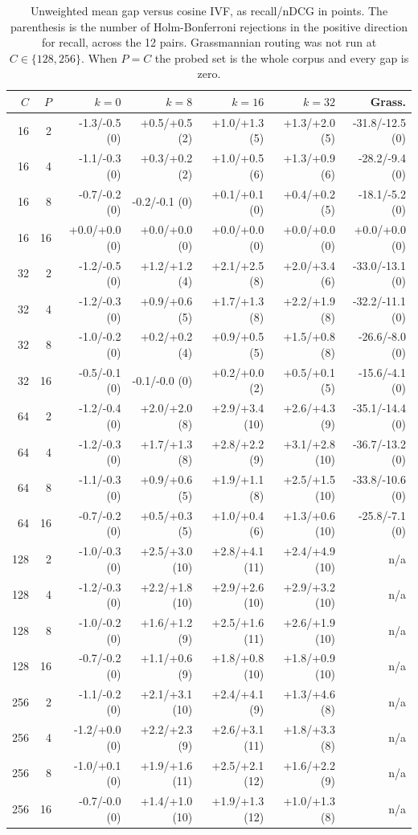 \begin{table}[t]
\centering
\caption{Unweighted mean gap versus cosine IVF, as recall/nDCG in points. The parenthesis is the number of Holm-Bonferroni rejections in the positive direction for recall, across the 12 pairs. Grassmannian routing was not run at $C \in \{128, 256\}$. When $P{=}C$ the probed set is the whole corpus and every gap is zero.}
\label{tab:kcurve}
\scriptsize
\setlength{\tabcolsep}{3pt}
\begin{tabular}{rrrrrrr}
\toprule
$C$ & $P$ & $k{=}0$ & $k{=}8$ & $k{=}16$ & $k{=}32$ & Grass. \\
\midrule
16 & 2 & -1.3/-0.5 (0) & +0.5/+0.5 (2) & +1.0/+1.3 (5) & +1.3/+2.0 (5) & -31.8/-12.5 (0) \\
16 & 4 & -1.1/-0.3 (0) & +0.3/+0.2 (2) & +1.0/+0.5 (6) & +1.3/+0.9 (6) & -28.2/-9.4 (0) \\
16 & 8 & -0.7/-0.2 (0) & -0.2/-0.1 (0) & +0.1/+0.1 (0) & +0.4/+0.2 (5) & -18.1/-5.2 (0) \\
16 & 16 & +0.0/+0.0 (0) & +0.0/+0.0 (0) & +0.0/+0.0 (0) & +0.0/+0.0 (0) & +0.0/+0.0 (0) \\
32 & 2 & -1.2/-0.5 (0) & +1.2/+1.2 (4) & +2.1/+2.5 (8) & +2.0/+3.4 (6) & -33.0/-13.1 (0) \\
32 & 4 & -1.2/-0.3 (0) & +0.9/+0.6 (5) & +1.7/+1.3 (8) & +2.2/+1.9 (8) & -32.2/-11.1 (0) \\
32 & 8 & -1.0/-0.2 (0) & +0.2/+0.2 (4) & +0.9/+0.5 (5) & +1.5/+0.8 (8) & -26.6/-8.0 (0) \\
32 & 16 & -0.5/-0.1 (0) & -0.1/-0.0 (0) & +0.2/+0.0 (2) & +0.5/+0.1 (5) & -15.6/-4.1 (0) \\
64 & 2 & -1.2/-0.4 (0) & +2.0/+2.0 (8) & +2.9/+3.4 (10) & +2.6/+4.3 (9) & -35.1/-14.4 (0) \\
64 & 4 & -1.2/-0.3 (0) & +1.7/+1.3 (8) & +2.8/+2.2 (9) & +3.1/+2.8 (10) & -36.7/-13.2 (0) \\
64 & 8 & -1.1/-0.3 (0) & +0.9/+0.6 (5) & +1.9/+1.1 (8) & +2.5/+1.5 (10) & -33.8/-10.6 (0) \\
64 & 16 & -0.7/-0.2 (0) & +0.5/+0.3 (5) & +1.0/+0.4 (6) & +1.3/+0.6 (10) & -25.8/-7.1 (0) \\
128 & 2 & -1.0/-0.3 (0) & +2.5/+3.0 (10) & +2.8/+4.1 (11) & +2.4/+4.9 (10) & n/a \\
128 & 4 & -1.2/-0.3 (0) & +2.2/+1.8 (10) & +2.9/+2.6 (10) & +2.9/+3.2 (10) & n/a \\
128 & 8 & -1.0/-0.2 (0) & +1.6/+1.2 (9) & +2.5/+1.6 (11) & +2.6/+1.9 (10) & n/a \\
128 & 16 & -0.7/-0.2 (0) & +1.1/+0.6 (9) & +1.8/+0.8 (10) & +1.8/+0.9 (10) & n/a \\
256 & 2 & -1.1/-0.2 (0) & +2.1/+3.1 (10) & +2.4/+4.1 (9) & +1.3/+4.6 (8) & n/a \\
256 & 4 & -1.2/+0.0 (0) & +2.2/+2.3 (9) & +2.6/+3.1 (11) & +1.8/+3.3 (8) & n/a \\
256 & 8 & -1.0/+0.1 (0) & +1.9/+1.6 (11) & +2.5/+2.1 (12) & +1.6/+2.2 (9) & n/a \\
256 & 16 & -0.7/-0.0 (0) & +1.4/+1.0 (10) & +1.9/+1.3 (12) & +1.0/+1.3 (8) & n/a \\
\bottomrule
\end{tabular}
\end{table}
